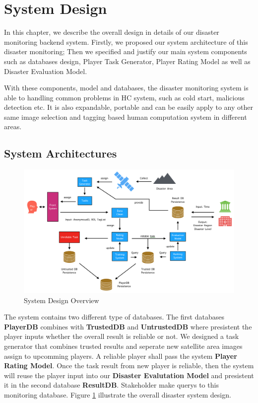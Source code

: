 \section{System Design}

In this chapter, we describe the overall design in details of our disaster monitoring backend system.
Firstly, we proposed our system architecture of this disaster monitoring;
Then we specified and justify our main system components such as databases design, 
Player Task Generator, Player Rating Model as well as Disaster Evaluation Model.

With these components, model and databases, the disaster monitoring system is able to handling
common problems in HC system, such as cold start, malicious detection etc. It is also expandable,
portable and can be easily apply to any other same image selection and tagging based
human computation system in different areas.

\subsection{System Architectures}

  \begin{figure}[htp]
  \centering
  \includegraphics[width=\textwidth]{figures/system2}
  \caption{System Design Overview}
  \label{fig:arch}
  \end{figure}

  The system contains two different type of databases. The first databases \textbf{PlayerDB}
  combines with \textbf{TrustedDB} and \textbf{UntrustedDB} where
  presistent the player inputs whether the overall result is reliable or not. 
  We designed a task generator that combines 
  trusted results and seperate new satellite area images assign to upcomming players. 
  A reliable player shall pass the system \textbf{Player Rating Model}. 
  Once the task result from new player is reliable, then the system will
  reuse the player input into our \textbf{Disaster Evalutation Model} and presistent it in the second
  database \textbf{ResultDB}. Stakeholder make querys to this monitoring database. 
  Figure \ref{fig:arch} illustrate the overall disaster system design.

